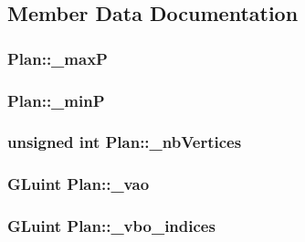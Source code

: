 \subsection{Member Data Documentation}
\hypertarget{class_plan_a2dce54e58d00f40ed8da5c9bd34c1232}{
\subsubsection[{\+\_\+max\+P}]{ Plan\+::\+\_\+max\+P\hspace{0.3cm}{\ttfamily [private]}}}\label{class_plan_a2dce54e58d00f40ed8da5c9bd34c1232}
\hypertarget{class_plan_aad9837a269e87fa5d7a4a5fc90abf3e7}{
\subsubsection[{\+\_\+min\+P}]{ Plan\+::\+\_\+min\+P\hspace{0.3cm}{\ttfamily [private]}}}\label{class_plan_aad9837a269e87fa5d7a4a5fc90abf3e7}
\hypertarget{class_plan_af3d9228c1b7dc91c0cb00d4c8fa5a550}{
\subsubsection[{\+\_\+nb\+Vertices}]{\setlength{\rightskip}{0pt plus 5cm}unsigned int Plan\+::\+\_\+nb\+Vertices\hspace{0.3cm}{\ttfamily [private]}}}\label{class_plan_af3d9228c1b7dc91c0cb00d4c8fa5a550}
\hypertarget{class_plan_ab4efe8532b73dd0efca80000afb0027d}{
\subsubsection[{\+\_\+vao}]{\setlength{\rightskip}{0pt plus 5cm}G\+Luint Plan\+::\+\_\+vao\hspace{0.3cm}{\ttfamily [private]}}}\label{class_plan_ab4efe8532b73dd0efca80000afb0027d}
\hypertarget{class_plan_ad8791ad67d66ac1b24792dc72ec00c64}{
\subsubsection[{\+\_\+vbo\+\_\+indices}]{\setlength{\rightskip}{0pt plus 5cm}G\+Luint Plan\+::\+\_\+vbo\+\_\+indices\hspace{0.3cm}{\ttfamily [private]}}}\label{class_plan_ad8791ad67d66ac1b24792dc72ec00c64}
